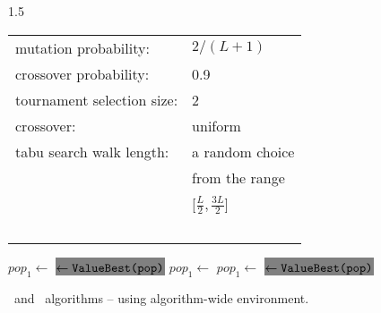 \begin{algorithm-wide}[!t]{1.5\textwidth}
\begin{footnotesize}
\begin{minipage}[!T]{0.52\linewidth}
\begin{tabular}{l l}
 mutation probability: & $2/(L+1)$ \\
 crossover probability: & 0.9 \\
 tournament selection size: & 2 \\
 crossover: & uniform \\
 tabu search walk length: & a random choice  \\
 ~~              &  from the range\\
 ~~              & {\small [$\frac{L}{2}, \frac{3 L}{2}$]}\\
 ~~              & ~~
\end{tabular}
\begin{algorithmic}[1]
\STATE $pop_1\gets$ 
\STATE {}
\STATE \colorbox{Gray} { $\gets \texttt{{ValueBest}(pop)}$}
        \STATE $\mathit{pop_1} \gets $
        \STATE $\mathit{pop_1} \gets $
        \STATE {}
        \STATE \colorbox{Gray}{ $\gets \texttt{{ValueBest}(pop)}$}
\ENDWHILE
\ENDPROCEDURE 
\end{algorithmic}
\vspace{2cm}
\end{minipage}
\caption[Algorithm file: alg-lssMAts-lssRRts-wide.tex]{\lssMAts\ and \lssRRts\ algorithms -- using algorithm-wide environment.} 
\label{alg-lssMAts-lssRRts-wide}
\end{footnotesize}
\end{algorithm-wide}